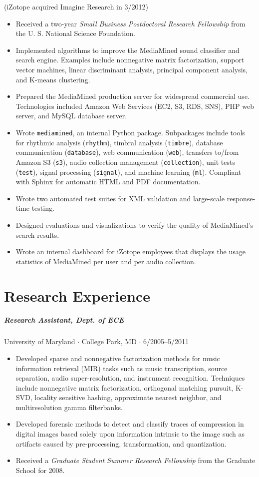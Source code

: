 \documentclass[10pt,letterpaper]{article}
\begin{document}
(iZotope acquired Imagine Research in 3/2012)
\begin{itemize}
    \item Received a two-year \textit{Small Business Postdoctoral Research Fellowship} from the U. S. National Science Foundation.
    \item Implemented algorithms to improve the MediaMined sound classifier and search engine. Examples include nonnegative matrix factorization, support vector machines, linear discriminant analysis, principal component analysis, and K-means clustering.
    \item Prepared the MediaMined production server for widespread commercial use. Technologies included Amazon Web Services (EC2, S3, RDS, SNS), PHP web server, and MySQL database server.
    \item Wrote \texttt{mediamined}, an internal Python package. Subpackages include tools for rhythmic analysis (\texttt{rhythm}), timbral analysis (\texttt{timbre}), database communication (\texttt{database}), web communication (\texttt{web}), transfers to/from Amazon S3 (\texttt{s3}), audio collection management (\texttt{collection}), unit tests (\texttt{test}), signal processing (\texttt{signal}), and machine learning (\texttt{ml}). Compliant with Sphinx for automatic HTML and PDF documentation.
    \item Wrote two automated test suites for XML validation and large-scale response-time testing.
    \item Designed evaluations and visualizations to verify the quality of MediaMined's search results.
    \item Wrote an internal dashboard for iZotope employees that displays the usage statistics of MediaMined per user and per audio collection.
\end{itemize}


\section*{Research Experience}

\subparagraph{Research Assistant, Dept. of ECE}
University of Maryland $\cdot$ College Park, MD $\cdot$ 6/2005--5/2011
\begin{itemize}
    \item Developed sparse and nonnegative factorization methods for music information retrieval (MIR) tasks such as music transcription, source separation, audio super-resolution, and instrument recognition. Techniques include nonnegative matrix factorization, orthogonal matching pursuit, K-SVD, locality sensitive hashing, approximate nearest neighbor, and multiresolution gamma filterbanks.
    \item Developed forensic methods to detect and classify traces of compression in digital images based solely upon information intrinsic to the image such as artifacts caused by pre-processing, transformation, and quantization.
    \item Received a \textit{Graduate Student Summer Research Fellowship} from the Graduate School for 2008.
\end{itemize}
\end{document}
